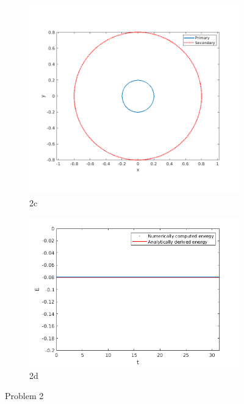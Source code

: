 \documentclass[a4paper]{article}
\begin{document}
		\begin{figure}
			\begin{subfigure} {.5\columnwidth}
				\includegraphics[width=\columnwidth]{../plots/2c_orbits.png}
				\caption{2c}
				\label{fig:2c}
			\end{subfigure}
			\hfill
			\begin{subfigure} {.5\columnwidth}
				\includegraphics[width=\columnwidth]{../plots/2d_energies.png}
				\caption{2d}
				\label{fig:2d}
			\end{subfigure}
			\caption{Problem 2}
			\label{fig:2}
		\end{figure}
\end{document}
